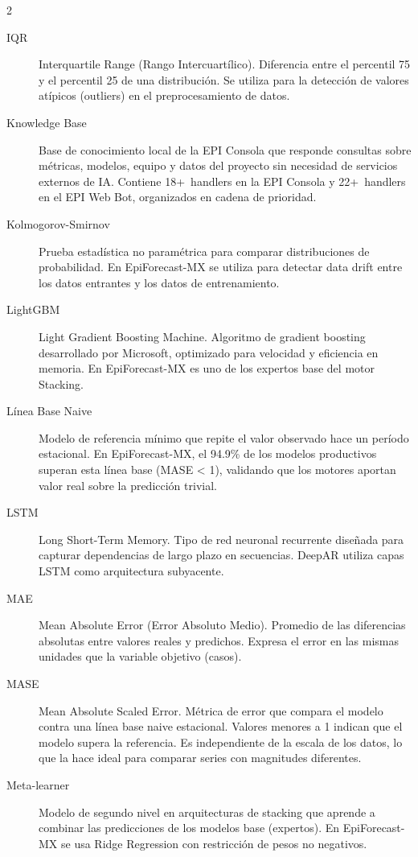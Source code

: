 \documentclass[12pt, letterpaper]{article}
\begin{document}
\begin{multicols}{2}
\begin{description}
\item[IQR]
Interquartile Range (Rango Intercuartílico). Diferencia entre el percentil 75 y el percentil 25 de una distribución. Se utiliza para la detección de valores atípicos (outliers) en el preprocesamiento de datos.

\item[Knowledge Base]
Base de conocimiento local de la EPI Consola que responde consultas sobre métricas, modelos, equipo y datos del proyecto sin necesidad de servicios externos de IA. Contiene 18+~handlers en la EPI Consola y 22+~handlers en el EPI Web Bot, organizados en cadena de prioridad.

\item[Kolmogorov-Smirnov]
Prueba estadística no paramétrica para comparar distribuciones de probabilidad. En EpiForecast-MX se utiliza para detectar data drift entre los datos entrantes y los datos de entrenamiento.

\item[LightGBM]
Light Gradient Boosting Machine. Algoritmo de gradient boosting desarrollado por Microsoft, optimizado para velocidad y eficiencia en memoria. En EpiForecast-MX es uno de los expertos base del motor Stacking.

\item[Línea Base Naive]
Modelo de referencia mínimo que repite el valor observado hace un período estacional. En EpiForecast-MX, el 94.9\% de los modelos productivos superan esta línea base (MASE < 1), validando que los motores aportan valor real sobre la predicción trivial.

\item[LSTM]
Long Short-Term Memory. Tipo de red neuronal recurrente diseñada para capturar dependencias de largo plazo en secuencias. DeepAR utiliza capas LSTM como arquitectura subyacente.

\item[MAE]
Mean Absolute Error (Error Absoluto Medio). Promedio de las diferencias absolutas entre valores reales y predichos. Expresa el error en las mismas unidades que la variable objetivo (casos).

\item[MASE]
Mean Absolute Scaled Error. Métrica de error que compara el modelo contra una línea base naive estacional. Valores menores a 1 indican que el modelo supera la referencia. Es independiente de la escala de los datos, lo que la hace ideal para comparar series con magnitudes diferentes.

\item[Meta-learner]
Modelo de segundo nivel en arquitecturas de stacking que aprende a combinar las predicciones de los modelos base (expertos). En EpiForecast-MX se usa Ridge Regression con restricción de pesos no negativos.


\end{description}
\end{multicols}
\end{document}
